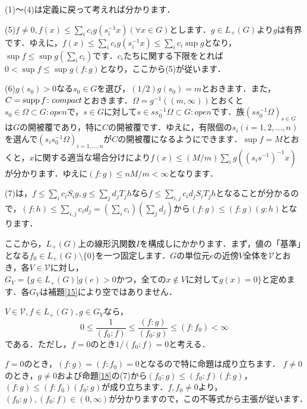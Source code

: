 \begin{Proof}
(1)〜(4)は定義に戻って考えれば分かります．

(5)$f \ne 0, f(x) \le \sum_{i}c_{i} g(s_{i}^{-1}x) (\forall x \in G)$とします．$g \in L_{+}(G)$より$g$は有界です．ゆえに，$f(x) \le \sum_{i}c_{i} g(s_{i}^{-1}x) \le \sum_{i}c_{i} \sup g$となり，$\sup f \le \sup g ( \sum_{i}c_{i} )$です．$c_i$たちに関する下限をとれば$0<\sup f \le \sup g (f \colon g )$となり，ここから(5)が従います．

(6)$g(s_{0}) > 0$なる$s_{0} \in G$を選び，$(1/2)g(s_{0})=m$とおきます．また，$C=\operatorname{supp} f \colon compact$とおきます．$\Omega = g^{-1}( (m, \infty) )$とおくと$s_{0} \in \Omega \subset G \colon open$で，$s \in G$に対して$s \in s s_{0}^{-1} \Omega \subset G \colon open$です．族$( s s_{0}^{-1}\Omega )_{s \in G}$は$G$の開被覆であり，特に$C$の開被覆です．ゆえに，有限個の$ s_i(i=1,2, \ldots , n)$を選んで$( s_{i} s_{0}^{-1}\Omega )_{i=1,\ldots ,n}$が$C$の開被覆になるようにできます．$\sup f=M$とおくと，$x$に関する適当な場合分けにより$f(x) \le (M/m)\sum_{i} g( (s_{i} s^{-1}) ^{-1}x)$が分かります．ゆえに$(f \colon g ) \le nM/m < \infty $となります．

(7)は，$f \le \sum_{i} c_{i}S_{i}g, g \le \sum_{j} d_{j}T_{j}h$なら$f \le \sum_{i,j} c_{i}d_{j}S_iT_{j}h$となることが分かるので，$(f \colon h ) \le \sum_{i,j} c_{i}d_{j} = ( \sum_{i} c_{i} ) (\sum_{j} d_{j} )$から$( f \colon g ) \le (f \colon g ) (g \colon h )$となります．　
\end{Proof}

ここから，$L_{+}(G)$上の線形汎関数$I$を構成しにかかります．まず，値の「基準」となる$f_{0} \in L_{+}(G) \setminus \{ 0 \}$を一つ固定します．$G$の単位元$e$の近傍$V$全体を$\mathscr{V}$とおき，各$V \in \mathscr{V}$に対し，$G_{V}=\{ g \in L_{+}(G) | g(e)>0 かつ，全ての x \not\in V に対してg(x)=0 \}$と定めます．各$G_V$は補題\ref{15}により空ではありません．

\begin{yprop}\label{19}
$V \in \mathscr{V}, f \in L_{+}(G), g \in G_{V}$なら，
\[
0 \le \frac{1}{( f_0 \colon f )} \le \frac{( f \colon g )}{( f_0 \colon g )} \le ( f \colon f_0 ) < \infty
\]
である．ただし，$f=0$のとき$1/( f_0 \colon f ) = 0$と考える．
\end{yprop}
\begin{Proof}
$f=0$のとき，$( f \colon g ) = ( f \colon f_0 ) = 0$となるので特に命題は成り立ちます．
$f \ne 0$のとき，$g \neq 0$および命題\ref{18}の(7)から$(f_0 \colon g) \le (f_0 \colon f) (f \colon g )$，$ (f \colon g) \le (f \colon f_0 ) (f_0 \colon g )$が成り立ちます．$f, f_0 \neq 0$より，$(f_0 \colon g), (f_0 \colon f) \in (0, \infty)$が分かりますので，この不等式から主張が従います．　
\end{Proof}

